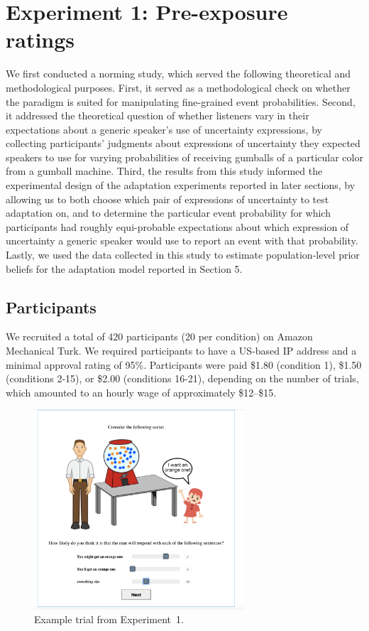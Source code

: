 \documentclass[man, floatsintext]{apa6}
\begin{document}
\section{Experiment 1: Pre-exposure ratings}
\label{sec:exp-norming}

We first conducted a norming study, which served the following theoretical and methodological purposes.
First, it served as a methodological check on whether the paradigm is suited for 
manipulating fine-grained event probabilities. 
Second, it addressed the theoretical question of whether listeners vary in their expectations about
a generic speaker's use of uncertainty expressions, by collecting participants' judgments about 
expressions of uncertainty they expected speakers to use for varying probabilities of receiving gumballs of a particular color from a gumball machine. 
Third,  the results from this study informed the experimental design of the adaptation experiments 
reported in later sections, by allowing us to both choose which pair of expressions of uncertainty to test adaptation on, 
and to determine the particular event probability for which participants had roughly equi-probable expectations 
about which expression of uncertainty a generic speaker would use to report an event with that probability. 
Lastly, we used the data collected in this study to 
estimate population-level prior beliefs for the adaptation model reported in Section 5.

\subsection{Participants}
We recruited a total of 420 participants 
(20 per condition) on Amazon Mechanical Turk. 
We required participants to have a US-based IP address and a minimal approval rating of 95\%.
Participants were paid \$1.80 (condition 1), \$1.50 (conditions 2-15),
or \$2.00 (conditions 16-21),
depending on the number of trials,
which amounted to an hourly wage of approximately \$12--\$15. 

\begin{figure}[th!]
\center
\includegraphics[width=0.7\textwidth, trim={0 0 1.1cm 0},clip]{plots/pre-test-example-trial.png} 
\caption{Example trial from Experiment~1. \label{fig:norming-trial} }
\end{figure}
\end{document}
